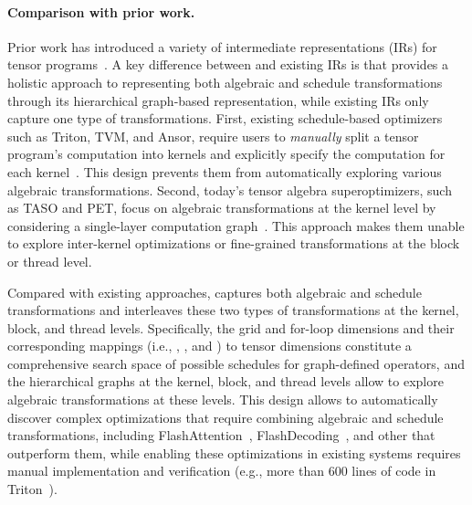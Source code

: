 \paragraph{Comparison with prior work.}
Prior work has introduced a variety of intermediate representations (IRs) for tensor programs~\cite{tillet2019triton, tvm, ansor}.
A key difference between \graph and existing IRs is that \graph provides a holistic approach to representing both algebraic and schedule transformations through its hierarchical graph-based representation, while existing IRs only capture one type of transformations.
%
First, existing schedule-based optimizers such as Triton, TVM, and Ansor, require users to {\em manually} split a tensor program's computation into kernels and explicitly specify the computation for each kernel~\cite{tillet2019triton, tvm, ansor}.
%
This design prevents them from automatically exploring various algebraic transformations.
%
Second, today's tensor algebra superoptimizers, such as TASO and PET, focus on algebraic transformations at the kernel level by considering a single-layer computation graph~\cite{TASO, wang2021pet}.
%
This approach makes them unable to explore inter-kernel optimizations or fine-grained transformations at the block or thread level.

Compared with existing approaches, \graph captures both algebraic and schedule transformations and interleaves these two types of transformations at the kernel, block, and thread levels.
%
Specifically, the grid and for-loop dimensions and their corresponding mappings (i.e., \imap, \omap, and \fmap) to tensor dimensions constitute a comprehensive search space of possible schedules for graph-defined operators, and the hierarchical graphs at the kernel, block, and thread levels allow \sys to explore algebraic transformations at these levels.
This design allows \sys to automatically discover complex optimizations that require combining algebraic and schedule transformations, including FlashAttention~\cite{dao2023flash}, FlashDecoding~\cite{hong2024flashdecoding}, and other \graphs that outperform them, while enabling these optimizations in existing systems requires manual implementation and verification (e.g., more than 600 lines of code in Triton~\cite{tillet2019triton}). 
\fi

